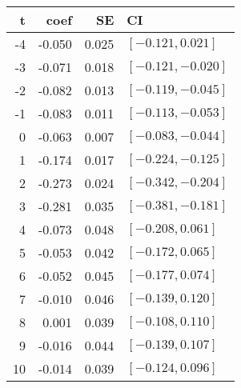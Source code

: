 
\begin{tabular}[t]{rrrl}
\toprule
t & coef & SE & CI\\
\midrule
-4 & -0.050 & 0.025 & $[-0.121 , 0.021]$\\
-3 & -0.071 & 0.018 & $[-0.121 , -0.020]$\\
-2 & -0.082 & 0.013 & $[-0.119 , -0.045]$\\
-1 & -0.083 & 0.011 & $[-0.113 , -0.053]$\\
0 & -0.063 & 0.007 & $[-0.083 , -0.044]$\\
1 & -0.174 & 0.017 & $[-0.224 , -0.125]$\\
2 & -0.273 & 0.024 & $[-0.342 , -0.204]$\\
3 & -0.281 & 0.035 & $[-0.381 , -0.181]$\\
4 & -0.073 & 0.048 & $[-0.208 , 0.061]$\\
5 & -0.053 & 0.042 & $[-0.172 , 0.065]$\\
6 & -0.052 & 0.045 & $[-0.177 , 0.074]$\\
7 & -0.010 & 0.046 & $[-0.139 , 0.120]$\\
8 & 0.001 & 0.039 & $[-0.108 , 0.110]$\\
9 & -0.016 & 0.044 & $[-0.139 , 0.107]$\\
10 & -0.014 & 0.039 & $[-0.124 , 0.096]$\\
\bottomrule
\end{tabular}
